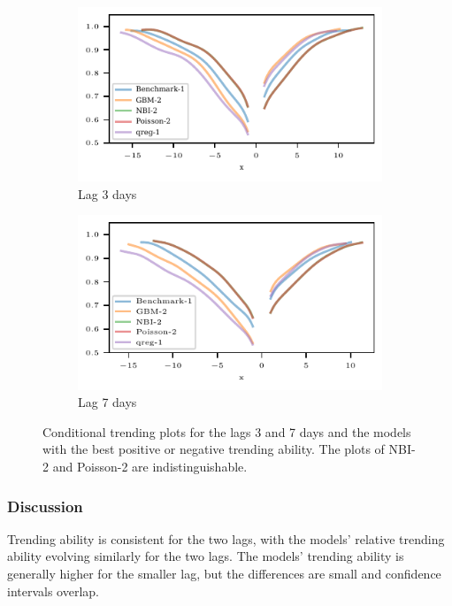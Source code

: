 \begin{figure}
    \centering
    \begin{subfigure}[t]{0.48\textwidth}
    \includegraphics{plots/ed_arrival/50_Cond_Prob_lag_3}
    \caption{Lag 3 days}
    \end{subfigure}\hfill
    \begin{subfigure}[t]{0.48\textwidth}
    \includegraphics{plots/ed_arrival/50_Cond_Prob_lag_7}
    \caption{Lag 7 days}
    \end{subfigure}
    \caption{Conditional trending plots for the lags 3 and 7 days and the models with the best positive or negative trending ability. The plots of NBI-2 and Poisson-2 are indistinguishable.}
    \label{fig:app-eda-cond-prob}
\end{figure}

\subsubsection*{Discussion}

Trending ability is consistent for the two lags, with the models' relative trending ability evolving similarly for the two lags.
The models' trending ability is generally higher for the smaller lag, but the differences are small and confidence intervals overlap.

